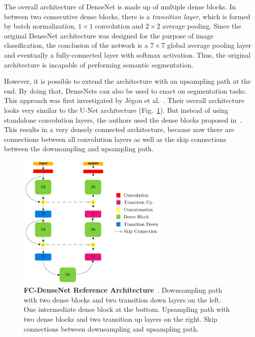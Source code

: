 The overall architecture of DenseNet is made up of multiple dense blocks. In between two consecutive dense blocks, there is a \emph{transition layer}, which is formed by batch normalization, $1\times 1$ convolution and $2\times 2$ average pooling. Since the original DenseNet architecture was designed for the purpose of image classification, the conclusion of the network is a $7\times 7$ global average pooling layer and eventually a fully-connected layer with softmax activation. Thus, the original architecture is incapable of performing semantic segmentation.

However, it is possible to extend the architecture with an upsampling path at the end. By doing that, DenseNets can also be used to enact on segmentation tasks. This approach was first investigated by Jégou et al.~\cite{denseseg17}. Their overall architecture looks very similar to the U-Net architecture (Fig.~\ref{fig:densenet_segmentation}). But instead of using standalone convolution layers, the authors used the dense blocks proposed in~\cite{densenet17}. This results in a very densely connected architecture, because now there are connections between all convolution layers as well as the skip connections between the downsampling and upsampling path.

\begin{figure}[h]
    \centering
    \includegraphics[width=0.65\textwidth]{images/dense_segmentation_architecture}
    \caption[FC-DenseNet Reference Architecture]
    {\textbf{FC-DenseNet Reference Architecture}~\cite{denseseg17}. Downsampling path with two dense blocks and two transition down layers on the left. One intermediate dense block at the bottom. Upsampling path with two dense blocks and two transition up layers on the right. Skip connections between downsampling and upsampling path.}
    \label{fig:densenet_segmentation}
\end{figure}

